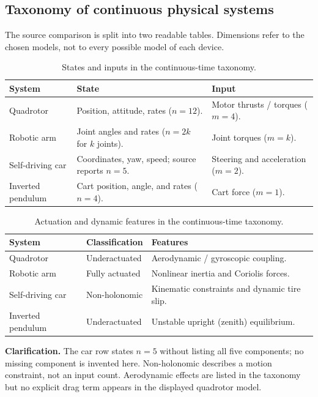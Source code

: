 \documentclass[11pt,a4paper]{article}
\numberwithin{equation}{section}
\numberwithin{figure}{section}
\numberwithin{table}{section}
\newcommand{\clarify}[1]{\par\textbf{Clarification.} #1\par}
\begin{document}
\subsection{Taxonomy of continuous physical systems}
The source comparison is split into two readable tables. Dimensions refer to the chosen models, not to every possible model of each device.
\begin{table}[htbp]\centering\small
\caption{States and inputs in the continuous-time taxonomy.}
\begin{tabularx}{\textwidth}{@{}P{27mm}YY@{}}\toprule
System & State & Input\\\midrule
Quadrotor & Position, attitude, rates ($n=12$). & Motor thrusts / torques ($m=4$).\\\addlinespace
Robotic arm & Joint angles and rates ($n=2k$ for $k$ joints). & Joint torques ($m=k$).\\\addlinespace
Self-driving car & Coordinates, yaw, speed; source reports $n=5$. & Steering and acceleration ($m=2$).\\\addlinespace
Inverted pendulum & Cart position, angle, and rates ($n=4$). & Cart force ($m=1$).\\\bottomrule
\end{tabularx}\end{table}
\begin{table}[htbp]\centering\small
\caption{Actuation and dynamic features in the continuous-time taxonomy.}
\begin{tabularx}{\textwidth}{@{}P{27mm}P{29mm}Y@{}}\toprule
System & Classification & Features\\\midrule
Quadrotor & Underactuated & Aerodynamic / gyroscopic coupling.\\\addlinespace
Robotic arm & Fully actuated & Nonlinear inertia and Coriolis forces.\\\addlinespace
Self-driving car & Non-holonomic & Kinematic constraints and dynamic tire slip.\\\addlinespace
Inverted pendulum & Underactuated & Unstable upright (zenith) equilibrium.\\\bottomrule
\end{tabularx}\end{table}\FloatBarrier
\clarify{The car row states $n=5$ without listing all five components; no missing component is invented here. Non-holonomic describes a motion constraint, not an input count. Aerodynamic effects are listed in the taxonomy but no explicit drag term appears in the displayed quadrotor model.}
\end{document}
